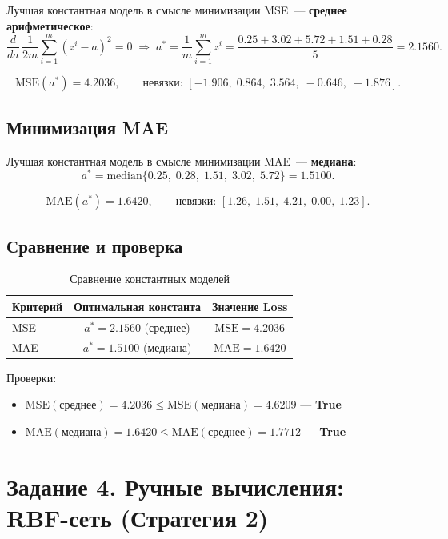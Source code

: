 \documentclass[12pt,a4paper]{article}
\begin{document}
Лучшая константная модель в смысле минимизации MSE~--- \textbf{среднее арифметическое}:
\[
  \frac{d}{da}\,\frac{1}{2m}\sum_{i=1}^m (z^i - a)^2 = 0
  \;\Rightarrow\;
  a^* = \frac{1}{m}\sum_{i=1}^m z^i = \frac{0.25 + 3.02 + 5.72 + 1.51 + 0.28}{5} = \mathbf{2.1560}.
\]

\[
  \mathrm{MSE}(a^*) = 4.2036, \qquad
  \text{невязки: } [-1.906,\; 0.864,\; 3.564,\; -0.646,\; -1.876].
\]

\subsection{Минимизация MAE}

Лучшая константная модель в смысле минимизации MAE~--- \textbf{медиана}:
\[
  a^* = \mathrm{median}\{0.25,\; 0.28,\; 1.51,\; 3.02,\; 5.72\} = \mathbf{1.5100}.
\]

\[
  \mathrm{MAE}(a^*) = 1.6420, \qquad
  \text{невязки: } [1.26,\; 1.51,\; 4.21,\; 0.00,\; 1.23].
\]

\subsection{Сравнение и проверка}

\begin{table}[H]
\centering
\caption{Сравнение константных моделей}
\begin{tabular}{lcc}
\toprule
Критерий & Оптимальная константа & Значение Loss \\
\midrule
MSE & $a^* = 2.1560$ (среднее) & $\mathrm{MSE} = 4.2036$ \\
MAE & $a^* = 1.5100$ (медиана) & $\mathrm{MAE} = 1.6420$ \\
\bottomrule
\end{tabular}
\end{table}

Проверки:
\begin{itemize}
  \item $\mathrm{MSE}(\text{среднее}) = 4.2036 \leq \mathrm{MSE}(\text{медиана}) = 4.6209$ --- \textbf{True}
  \item $\mathrm{MAE}(\text{медиана}) = 1.6420 \leq \mathrm{MAE}(\text{среднее}) = 1.7712$ --- \textbf{True}
\end{itemize}


\section{Задание 4. Ручные вычисления: RBF-сеть (Стратегия 2)}
\end{document}
